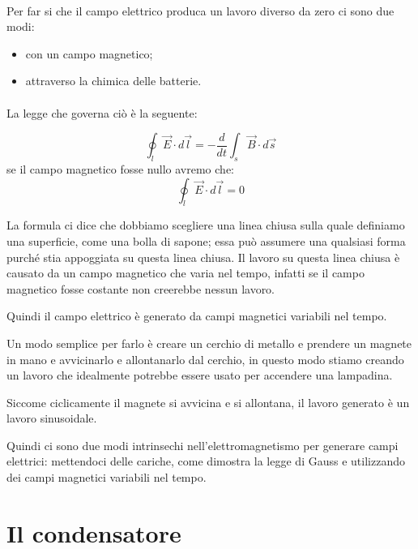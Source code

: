 \paragraph{}
Per far si che il campo elettrico produca un lavoro diverso da zero ci sono due modi:

\begin{itemize}
    \item con un campo magnetico;
    \item attraverso la chimica delle batterie.
\end{itemize}

\paragraph{}
La legge che governa ciò è la seguente:

\begin{equation}
    \oint_l \vec{E}\cdot d\vec{l} = -\frac{d}{dt} \int_s\vec{B}\cdot d\vec{s} 
\end{equation}
se il campo magnetico fosse nullo avremo che:
\begin{equation}
    \oint_l\vec{E}\cdot d\vec{l} = 0
    \label{lavoroNulloElettrone}
\end{equation}

La formula ci dice che dobbiamo scegliere una linea chiusa sulla quale definiamo una superficie, come una bolla di sapone; essa può assumere una qualsiasi forma purché stia appoggiata su questa linea chiusa.
Il lavoro su questa linea chiusa è causato da un campo magnetico che varia nel tempo, infatti se il campo magnetico fosse costante non creerebbe nessun lavoro. 

Quindi il campo elettrico è generato da campi magnetici variabili nel tempo.
 
Un modo semplice per farlo è creare un cerchio di metallo e prendere un magnete in mano e avvicinarlo e allontanarlo dal cerchio, in questo modo stiamo creando un lavoro che idealmente potrebbe essere usato per accendere una lampadina.

Siccome ciclicamente il magnete si avvicina e si allontana, il lavoro generato è un lavoro sinusoidale.

Quindi ci sono due modi intrinsechi nell'elettromagnetismo per generare campi elettrici: mettendoci delle cariche, come dimostra la legge di Gauss e utilizzando dei campi magnetici variabili nel tempo.


\section{Il condensatore}

